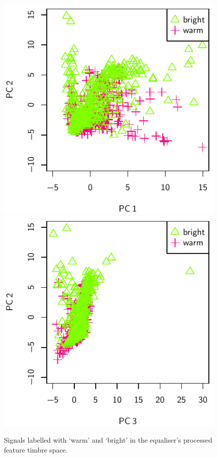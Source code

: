 			\begin{figure}[h!]
				\centering
				\subfloat
				{
					\includegraphics{chapter4/Images/EqualiserBWProcessedPCA1-2.pdf}
					\label{fig:EqualiserProcessedPCA1-2}
				}
				\quad
				\subfloat
				{
					\includegraphics{chapter4/Images/EqualiserBWProcessedPCA3-2.pdf}
					\label{fig:EqualiserProcessedPCA3-2}
				}
				\caption{Signals labelled with `warm' and `bright' in the equaliser's processed
					 feature timbre space.}
				\label{fig:EqualiserBWProcessedPCAs}
			\end{figure}

